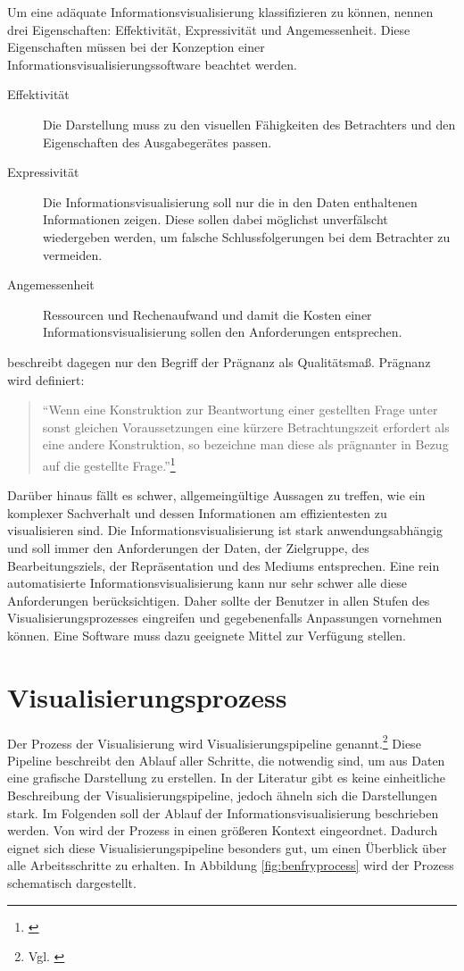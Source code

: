 \documentclass[a4paper, 
               12pt,
               DIV=calc,
               version=first,
               pdftex,
               headsepline,
               footsepline,
               bibliography=totocnumbered,
               listof=numbered]{scrreprt}
\begin{document}
Um eine adäquate Informationsvisualisierung klassifizieren zu können, nennen \cite{Schumann} drei Eigenschaften:
Effektivität, Expressivität und Angemessenheit. Diese Eigenschaften müssen bei der Konzeption einer
Informationsvisualisierungssoftware beachtet werden.
\begin{description}
\item[Effektivität]
Die Darstellung muss zu den visuellen Fähigkeiten des Betrachters und den Eigenschaften des Ausgabegerätes
passen.
\item[Expressivität]
Die Informationsvisualisierung soll nur die in den Daten enthaltenen Informationen zeigen.
Diese sollen dabei möglichst unverfälscht wiedergeben werden, um falsche Schlussfolgerungen bei dem Betrachter zu vermeiden.
\item[Angemessenheit]
Ressourcen und Rechenaufwand und damit die Kosten einer Informationsvisualisierung sollen den Anforderungen entsprechen.
\end{description}
\cite{Bertin} beschreibt dagegen nur den Begriff der Prägnanz als Qualitätsmaß.
Prägnanz wird definiert:
\begin{quote}
"`Wenn eine Konstruktion zur Beantwortung einer gestellten Frage unter sonst gleichen Voraussetzungen eine
kürzere Betrachtungszeit erfordert als eine andere Konstruktion, so bezeichne man diese als prägnanter in
Bezug auf die gestellte Frage."'\footnote{\citep[S.\,17]{Bertin}}
\end{quote}
Darüber hinaus fällt es schwer, allgemeingültige Aussagen zu treffen, wie ein komplexer Sachverhalt und dessen
Informationen am effizientesten zu visualisieren sind. Die Informationsvisualisierung ist stark anwendungsabhängig und soll
immer den Anforderungen der Daten, der Zielgruppe, des Bearbeitungsziels, der Repräsentation und des Mediums entsprechen.
Eine rein automatisierte Informationsvisualisierung kann nur sehr schwer alle diese Anforderungen berücksichtigen. Daher
sollte der Benutzer in allen Stufen des Visualisierungsprozesses eingreifen und gegebenenfalls Anpassungen vornehmen können. Eine Software
muss dazu geeignete Mittel zur Verfügung stellen.

\section{Visualisierungsprozess}
\label{sec:Pipeline}
Der Prozess der Visualisierung wird Visualisierungspipeline genannt.\footnote{Vgl. \citep[S.\,15]{Schumann}}
Diese Pipeline beschreibt den Ablauf aller
Schritte, die notwendig sind, um aus Daten eine grafische Darstellung zu erstellen. In der Literatur gibt es keine einheitliche
Beschreibung der Visualisierungspipeline, jedoch ähneln sich die Darstellungen stark.
Im Folgenden soll der Ablauf der Informationsvisualisierung
beschrieben werden. Von \cite{BenFry} wird der Prozess in einen
größeren Kontext eingeordnet. Dadurch eignet sich diese
Visualisierungspipeline besonders gut, um einen Überblick über alle Arbeitsschritte zu erhalten. In
Abbildung \ref{fig:benfryprocess} wird der Prozess schematisch dargestellt.
\end{document}
